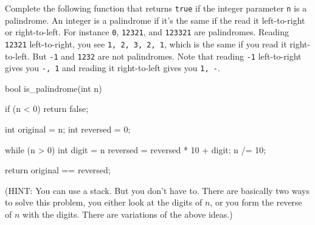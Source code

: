 \nextq
Complete the following function that returns \verb!true! if the integer
parameter \verb!n! is a palindrome.
An integer is a palindrome if it's the same if the read it
left-to-right or right-to-left.
For instance \verb!0!, \verb!12321!, and \verb!123321! are palindromes.
Reading \verb!12321! left-to-right, you see \verb!1, 2, 3, 2, 1!,
which is the same if you read it right-to-left.
But \verb!-1! and \verb!1232! are not palindromes.
Note that reading \verb!-1! left-to-right gives you \verb!-, 1!
and reading it right-to-left gives you \verb!1, -!.
\\
\ANSWER
\begin{answercode}
bool is_palindrome(int n)
{
  if (n < 0) return false;

    int original = n;
    int reversed = 0;

    while (n > 0)
    {
        int digit = n %
        reversed = reversed * 10 + digit;
        n /= 10;
    }

    return original == reversed;
}
\end{answercode}
(HINT: You can use a stack.
But you don't have to.
There are basically two ways to solve this problem,
you either look at the digits of $n$, or you form the reverse of $n$ with the
digits. There are variations of the above ideas.)


